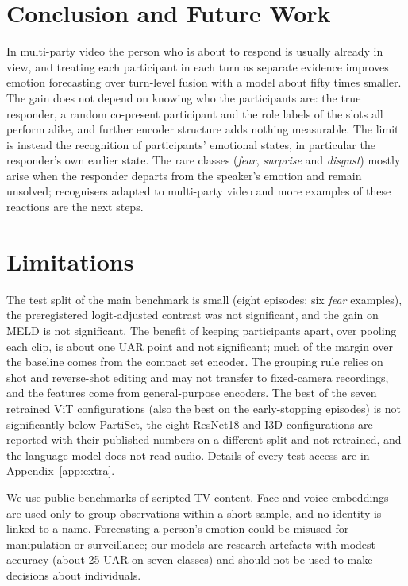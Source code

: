 \documentclass[11pt]{article}
\newcommand{\model}{PartiSet}
\begin{document}
\section{Conclusion and Future Work}
\label{sec:conclusion}

In multi-party video the person who is about to respond is usually already in view, and treating each participant in
each turn as separate evidence improves emotion forecasting over turn-level fusion with a model about fifty times smaller.
The gain does not depend on knowing who the participants are: the true responder, a random co-present participant and
the role labels of the slots all perform alike, and further encoder structure adds nothing measurable. The limit is
instead the recognition of participants' emotional states, in particular the responder's own earlier state. The rare
classes (\emph{fear}, \emph{surprise} and \emph{disgust}) mostly arise when the responder departs from the speaker's
emotion and remain unsolved; recognisers adapted to multi-party video and more examples of these reactions are the
next steps.

\section*{Limitations}

The test split of the main benchmark is small (eight episodes; six \emph{fear} examples), the preregistered
logit-adjusted contrast was not significant, and the gain on MELD is not significant. The benefit of keeping
participants apart, over pooling each clip, is about one UAR point and not significant; much of the margin over the
baseline comes from the compact set encoder. The grouping rule relies on shot and reverse-shot editing and may not
transfer to fixed-camera recordings, and the features come from general-purpose encoders. The best of the seven retrained
ViT configurations (also the best on the early-stopping episodes) is not significantly below \model{}, the eight ResNet18 and
I3D configurations are reported with their published numbers on a different split and not retrained, and the language
model does not read audio. Details of every test access are in Appendix~\ref{app:extra}.

We use public benchmarks of scripted TV content. Face and voice embeddings are used only to group observations
within a short sample, and no identity is linked to a name. Forecasting a person's emotion could be misused for
manipulation or surveillance; our models are research artefacts with modest accuracy (about 25 UAR on seven classes)
and should not be used to make decisions about individuals.
\end{document}
